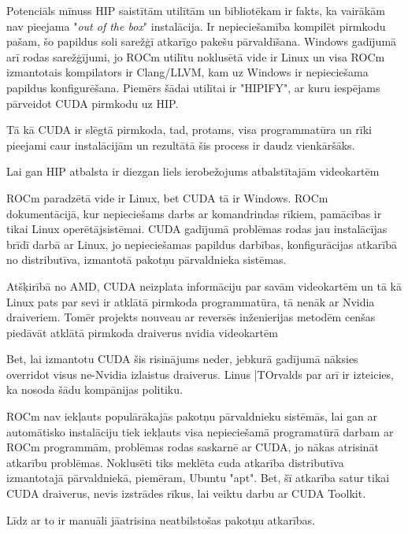 \documentclass[12pt]{report}%
\theoremstyle{definition}
\begin{document}
Potenciāls mīnuss HIP saistītām utilītām un bibliotēkam ir fakts, ka vairākām nav pieejama
"\textit{out of the box}" instalācija. Ir nepieciešamība kompilēt pirmkodu pašam, šo papildus soli
sarežģī atkarīgo pakešu pārvaldīšana. Windows gadījumā arī rodas sarežģījumi, jo ROCm utilītu noklusētā vide
ir Linux un visa ROCm izmantotais kompilators ir Clang/LLVM, kam uz Windows ir nepieciešama papildus 
konfigurēšana.
Piemērs šādai utilītai ir "HIPIFY", ar kuru iespējams pārveidot CUDA pirmkodu uz HIP. \cite{HIPIFY_github}

Tā kā CUDA ir slēgtā pirmkoda, tad, protams, visa programmatūra un rīki pieejami caur instalācijām un
rezultātā šis process ir daudz vienkāršāks.

Lai gan HIP atbalsta ir diezgan liels ierobežojums atbalstītajām videokartēm




ROCm paradzētā vide ir Linux, bet CUDA tā ir Windows. ROCm dokumentācijā, kur nepieciešams darbs ar komandrindas rīkiem, pamācības ir tikai Linux operētājsistēmai. CUDA gadījumā problēmas rodas jau instalācījas brīdī darbā ar Linux, jo nepieciešamas papildus darbības, konfigurācijas atkarībā no distributīva, izmantotā pakotņu pārvaldnieka sistēmas.

Atšķirībā no AMD, CUDA neizplata informāciju par savām videokartēm un tā kā Linux pats par sevi ir atklātā
pirmkoda programmatūra, tā nenāk ar Nvidia draiveriem. Tomēr projekts nouveau ar reversēs inženierijas
metodēm cenšas piedāvāt atklātā pirmkoda draiverus nvidia videokartēm

Bet, lai izmantotu CUDA šis risinājums neder, jebkurā gadījumā nāksies overridot visus ne-Nvidia izlaistus draiverus. Linus |TOrvalds par arī ir izteicies, ka nosoda šādu kompānijas politiku.





ROCm nav iekļauts populārākajās pakotņu pārvaldnieku sistēmās, lai gan ar automātisko instalāciju 
tiek iekļauts visa nepieciešamā programatūrā darbam ar ROCm programmām, problēmas rodas saskarnē ar
CUDA, jo nākas atrisināt atkarību problēmas. Noklusēti tiks meklēta cuda atkarība distributīva izmantotajā
pārvaldniekā, piemēram, Ubuntu "apt". Bet, šī atkarība satur tikai CUDA draiverus, nevis 
izstrādes rīkus, lai veiktu darbu ar CUDA Toolkit. 

Līdz ar to ir manuāli jāatrisina neatbilstošas pakotņu atkarības.
\end{document}
